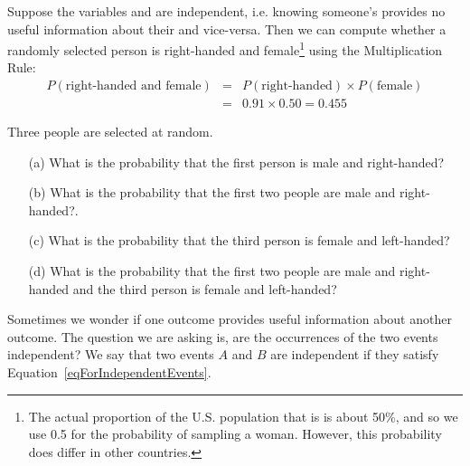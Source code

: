 \D{\newpage}

Suppose the variables  and  are independent, i.e. knowing someone's  provides no useful information about their  and vice-versa. Then we can compute whether a randomly selected person is right-handed and female\footnote{The actual proportion of the U.S. population that is  is about 50\%, and so we use 0.5 for the probability of sampling a woman. However, this probability does differ in other countries.} using the Multiplication Rule:
\begin{eqnarray*}
P(\text{right-handed and female}) &=& P(\text{right-handed}) \times  P(\text{female}) \\
&=& 0.91 \times  0.50 = 0.455
\end{eqnarray*}


\begin{exercisewrap}
\begin{nexercise}
Three people are selected at random.\footnotemark \vspace{-1.5mm}
\begin{enumerate}
\setlength{\itemsep}{0mm}
\item[(a)] What is the probability that the first person is male and right-handed?
\item[(b)] What is the probability that the first two people are male and right-handed?.
\item[(c)] What is the probability that the third person is female and left-handed?
\item[(d)] What is the probability that the first two people are male and right-handed and the third person is female and left-handed?
\end{enumerate}
\end{nexercise}
\end{exercisewrap}

Sometimes we wonder if one outcome provides useful information about another outcome. The question we are asking is, are the occurrences of the two events independent? We say that two events $A$ and $B$ are independent if they satisfy Equation~\eqref{eqForIndependentEvents}.

